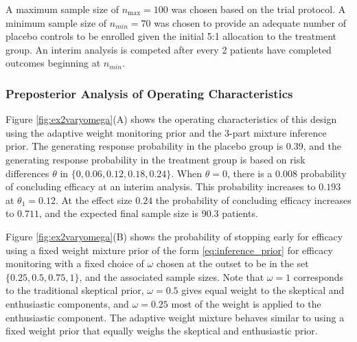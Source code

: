 \documentclass[useAMS,usenatbib,referee]{biom}
\begin{document}
A maximum sample size of $n_{\text{max}}=100$ was chosen based on the trial protocol. A minimum sample size of $n_{min}=70$ was chosen to provide an adequate number of placebo controls to be enrolled given the initial 5:1 allocation to the treatment group.
%
An interim analysis is competed after every 2 patients have completed outcomes beginning at $n_{min}$.

\subsubsection{Preposterior Analysis of Operating Characteristics}\label{sec:ex2operatingcharacteristics} 


Figure \ref{fig:ex2varyomega}(A) shows the operating characteristics of this design using the adaptive weight monitoring prior and the 3-part mixture inference prior. The generating response probability in the placebo group is 0.39, and the generating response probability in the treatment group is based on risk differences $\theta$ in $\{0, 0.06, 0.12, 0.18, 0.24\}$. When $\theta=0$, there is a 0.008 probability of concluding efficacy at an interim analysis. This probability increases to $0.193$ at $\theta_1=0.12$. At the effect size $0.24$ the probability of concluding efficacy increases to $0.711$, and the expected final sample size is 90.3 patients.

Figure \ref{fig:ex2varyomega}(B) shows the probability of stopping early for efficacy using a fixed weight mixture prior of the form \eqref{eq:inference_prior}  for efficacy monitoring with a fixed choice of $\omega$ chosen at the outset to be in the set $\{0.25,0.5,0.75,1\}$, and the associated sample sizes. Note that $\omega=1$ corresponds to the traditional skeptical prior, $\omega=0.5$ gives equal weight to the skeptical and enthusiastic components, and $\omega=0.25$ most of the weight is applied to the enthusiastic component. The adaptive weight mixture behaves similar to using a fixed weight prior that equally weighs the skeptical and enthusiastic prior.
\end{document}
